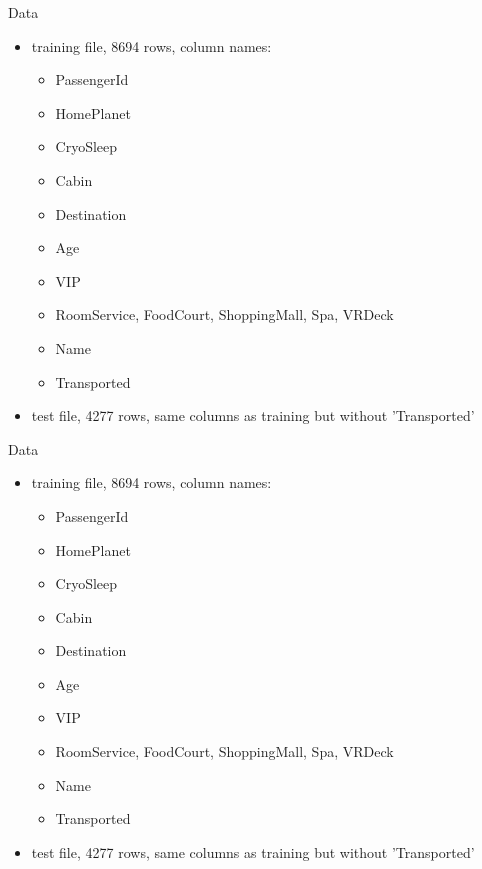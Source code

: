 \documentclass{beamer}
\begin{document}
\begin{frame}{Data}
    \begin{itemize}
        \item training file, 8694 rows, column names:
            \begin{itemize}
                \item PassengerId
                \item HomePlanet
                \item CryoSleep
                \item Cabin
                \item Destination
                \item Age
                \item VIP
                \item RoomService, FoodCourt, ShoppingMall, Spa, VRDeck
                \item Name
                \item Transported
            \end{itemize}
        \item test file, 4277 rows, same columns as training but without 'Transported'
    \end{itemize}
\end{frame}


\begin{frame}{Data}
    \begin{itemize}
        \item training file, 8694 rows, column names:
            \begin{itemize}
                \item PassengerId
                \item HomePlanet
                \item CryoSleep
                \item Cabin
                \item Destination
                \item Age
                \item VIP
                \item RoomService, FoodCourt, ShoppingMall, Spa, VRDeck
                \item Name
                \item Transported
            \end{itemize}
        \item test file, 4277 rows, same columns as training but without 'Transported'
    \end{itemize}
\end{frame}
\end{document}
